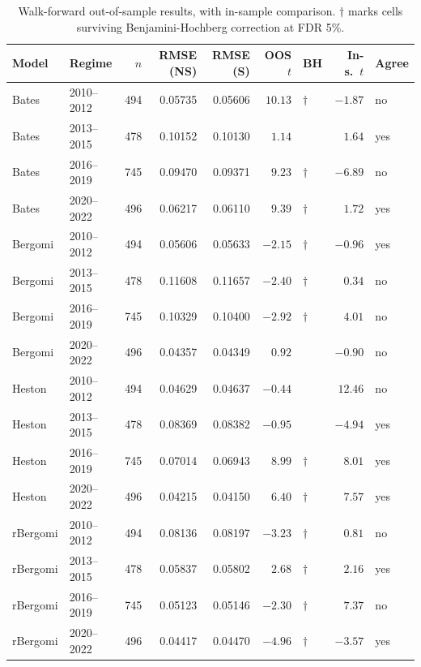 \documentclass[11pt,a4paper]{article}
\begin{document}
\begin{table}[h]
\centering
\small
\caption{Walk-forward out-of-sample results, with in-sample comparison.
$\dagger$ marks cells surviving Benjamini-Hochberg correction at FDR 5\%.}
\label{tab:oos}
\begin{tabular}{llrrrrlrl}
\toprule
Model & Regime & $n$ & RMSE (NS) & RMSE (S) & OOS $t$ & BH & In-s.\ $t$ & Agree \\
\midrule
Bates    & 2010--2012 & 494 & 0.05735 & 0.05606 & $10.13$ & $\dagger$ & $-1.87$ & no \\
Bates    & 2013--2015 & 478 & 0.10152 & 0.10130 & $1.14$  &           & $1.64$  & yes \\
Bates    & 2016--2019 & 745 & 0.09470 & 0.09371 & $9.23$  & $\dagger$ & $-6.89$ & no \\
Bates    & 2020--2022 & 496 & 0.06217 & 0.06110 & $9.39$  & $\dagger$ & $1.72$  & yes \\
Bergomi  & 2010--2012 & 494 & 0.05606 & 0.05633 & $-2.15$ & $\dagger$ & $-0.96$ & yes \\
Bergomi  & 2013--2015 & 478 & 0.11608 & 0.11657 & $-2.40$ & $\dagger$ & $0.34$  & no \\
Bergomi  & 2016--2019 & 745 & 0.10329 & 0.10400 & $-2.92$ & $\dagger$ & $4.01$  & no \\
Bergomi  & 2020--2022 & 496 & 0.04357 & 0.04349 & $0.92$  &           & $-0.90$ & no \\
Heston   & 2010--2012 & 494 & 0.04629 & 0.04637 & $-0.44$ &           & $12.46$ & no \\
Heston   & 2013--2015 & 478 & 0.08369 & 0.08382 & $-0.95$ &           & $-4.94$ & yes \\
Heston   & 2016--2019 & 745 & 0.07014 & 0.06943 & $8.99$  & $\dagger$ & $8.01$  & yes \\
Heston   & 2020--2022 & 496 & 0.04215 & 0.04150 & $6.40$  & $\dagger$ & $7.57$  & yes \\
rBergomi & 2010--2012 & 494 & 0.08136 & 0.08197 & $-3.23$ & $\dagger$ & $0.81$  & no \\
rBergomi & 2013--2015 & 478 & 0.05837 & 0.05802 & $2.68$  & $\dagger$ & $2.16$  & yes \\
rBergomi & 2016--2019 & 745 & 0.05123 & 0.05146 & $-2.30$ & $\dagger$ & $7.37$  & no \\
rBergomi & 2020--2022 & 496 & 0.04417 & 0.04470 & $-4.96$ & $\dagger$ & $-3.57$ & yes \\
\bottomrule
\end{tabular}
\end{table}
\end{document}
